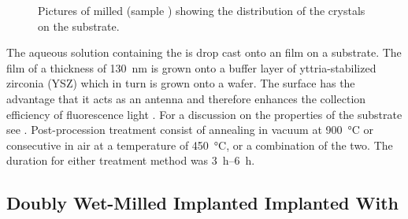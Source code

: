		\begin{figure}[htp]
			\centering
			\caption[Distribution of \nds on-top of an \ir substrate]{Pictures of milled \nds (sample \insituH) showing the distribution of the \nd crystals on the \ir substrate.}
			 \label{fig::sem_milled}
		\end{figure}

		The aqueous solution containing the \nds is drop cast onto an \ir film on a \Si substrate.
		The \ir film of a thickness of \SI{130}{nm} is grown onto a buffer layer of yttria-stabilized zirconia (YSZ) which in turn is grown onto a \Si wafer.
		The \ir surface has the advantage that it acts as an antenna and therefore enhances the collection efficiency of fluorescence light \cite{Neu2012a}. For a discussion on the properties of the substrate see .
		Post-procession treatment consist of annealing in vacuum at \SI{900}{\degreeCelsius} or consecutive \ox in air at a temperature of \SI{450}{\degreeCelsius}, or a combination of the two.
		The duration for either treatment method was \SIrange{3}{6}{\hour}.

	\subsection{Doubly Wet-Milled Implanted \Nds Implanted With \Si}\label{subsec::2_milled_nds}

